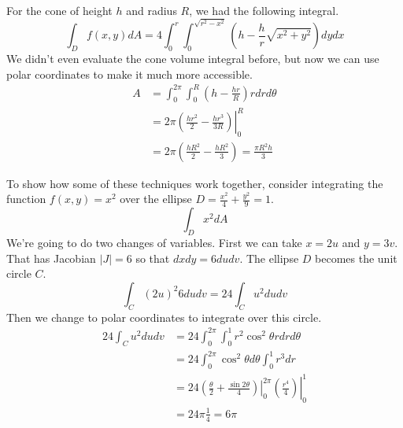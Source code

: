\documentclass[fleqn,letterpaper]{report}
\begin{document}
\begin{example}
For the cone of height
$h$ and radius $R$, we had the following integral.
\begin{equation*}
\int_D f(x,y) dA = 4 \int_0^r \int_0^{\sqrt{r^2 - x^2}} \left(
h - \frac{h}{r} \sqrt{x^2 + y^2} \right) dy dx
\end{equation*}
We didn't even evaluate the cone volume integral before, but
now we can use polar coordinates to make it much more
accessible.
\begin{align*}
A & = \int_0^{2\pi} \int_0^R \left( h - \frac{hr}{R} \right) r
dr d\theta \\
& = 2\pi \left. \left( \frac{hr^2}{2} - \frac{hr^3}{3R} \right)
\right|_0^R \\
& = 2\pi \left( \frac{hR^2}{2} - \frac{hR^2}{3} \right) =
\frac{\pi R^2 h}{3}
\end{align*}
\end{example}

\begin{example}
To show how some of these techniques work together, consider
integrating the function $f(x,y) = x^2$ over the ellipse
$D = \frac{x^2}{4} + \frac{y^2}{9} = 1$.
\begin{equation*}
\int_D x^2 dA 
\end{equation*}
We're going to do two changes of variables. First we can take
$x=2u$ and $y=3v$. That has Jacobian $|J| = 6$ so that $dx dy
= 6 du dv$. The ellipse $D$ becomes the unit circle $C$.
\begin{equation*}
\int_C (2u)^2 6 du dv = 24 \int_C u^2 du dv 
\end{equation*}
Then we change to polar coordinates to integrate over this
circle.
\begin{align*}
24 \int_C u^2 du dv & = 24 \int_0^{2\pi} \int_0^1 r^2 \cos^2
\theta r dr d\theta \\
& = 24 \int_0^{2\pi} \cos^2 \theta d \theta \int_0^1 r^3 dr \\
& = 24 \left. \left( \frac{\theta}{2} + \frac{\sin 2\theta}{4}
\right) \right|_0^{2\pi} \left. \left( \frac{r^4}{4} \right)
\right|_0^1 \\
& = 24 \pi \frac{1}{4} = 6 \pi 
\end{align*}
\end{example}
\end{document}
